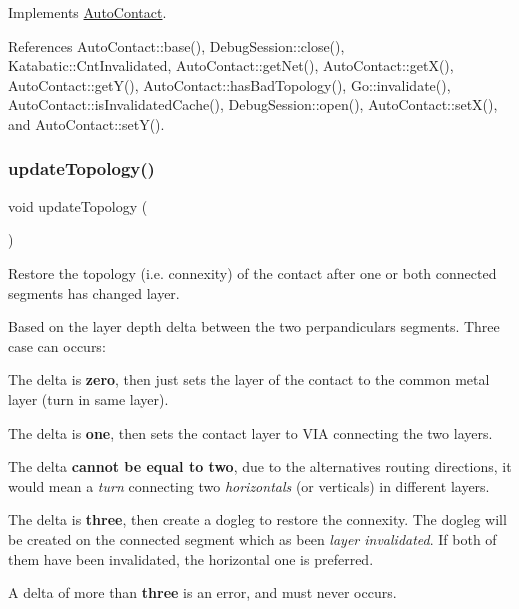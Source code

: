 Implements \hyperlink{classKatabatic_1_1AutoContact_af6a2454547eeb7f5a519970dcb467e90}{Auto\+Contact}.



References Auto\+Contact\+::base(), Debug\+Session\+::close(), Katabatic\+::\+Cnt\+Invalidated, Auto\+Contact\+::get\+Net(), Auto\+Contact\+::get\+X(), Auto\+Contact\+::get\+Y(), Auto\+Contact\+::has\+Bad\+Topology(), Go\+::invalidate(), Auto\+Contact\+::is\+Invalidated\+Cache(), Debug\+Session\+::open(), Auto\+Contact\+::set\+X(), and Auto\+Contact\+::set\+Y().

\mbox{\label{classKatabatic_1_1AutoContactTurn_af5bf1f5e71204ef84346e4e036175431}} 
\subsubsection{\texorpdfstring{update\+Topology()}{updateTopology()}}
{\footnotesize\ttfamily void update\+Topology (\begin{DoxyParamCaption}{ }\end{DoxyParamCaption})\hspace{0.3cm}{\ttfamily [virtual]}}

Restore the topology (i.\+e. connexity) of the contact after one or both connected segments has changed layer.

Based on the layer depth delta between the two perpandiculars segments. Three case can occurs\+:
\begin{DoxyItemize}
\item The delta is {\bfseries zero}, then just sets the layer of the contact to the common metal layer (turn in same layer).
\item The delta is {\bfseries one}, then sets the contact layer to V\+IA connecting the two layers.
\item The delta {\bfseries cannot be equal to two}, due to the alternatives routing directions, it would mean a {\itshape turn} connecting two {\itshape horizontals} (or verticals) in different layers.
\item The delta is {\bfseries three}, then create a dogleg to restore the connexity. The dogleg will be created on the connected segment which as been {\itshape layer invalidated}. If both of them have been invalidated, the horizontal one is preferred.
\item A delta of more than {\bfseries three} is an error, and must never occurs.
\end{DoxyItemize}

